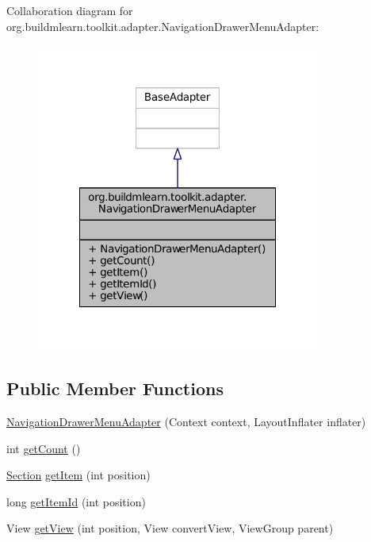 Collaboration diagram for org.\-buildmlearn.\-toolkit.\-adapter.\-Navigation\-Drawer\-Menu\-Adapter\-:
\nopagebreak
\begin{figure}[H]
\begin{center}
\leavevmode
\includegraphics[width=264pt]{d2/d59/classorg_1_1buildmlearn_1_1toolkit_1_1adapter_1_1NavigationDrawerMenuAdapter__coll__graph}
\end{center}
\end{figure}
\subsection*{Public Member Functions}
\begin{DoxyCompactItemize}
\item 
\hyperlink{classorg_1_1buildmlearn_1_1toolkit_1_1adapter_1_1NavigationDrawerMenuAdapter_a148e19ae5430bf4ca719570d18d7aba8}{Navigation\-Drawer\-Menu\-Adapter} (Context context, Layout\-Inflater inflater)
\item 
int \hyperlink{classorg_1_1buildmlearn_1_1toolkit_1_1adapter_1_1NavigationDrawerMenuAdapter_a05a59638b45d17d3852db05405de25c1}{get\-Count} ()
\item 
\hyperlink{enumorg_1_1buildmlearn_1_1toolkit_1_1model_1_1Section}{Section} \hyperlink{classorg_1_1buildmlearn_1_1toolkit_1_1adapter_1_1NavigationDrawerMenuAdapter_a5a1da2dcdb45463a2e24f39f4dc111b9}{get\-Item} (int position)
\item 
long \hyperlink{classorg_1_1buildmlearn_1_1toolkit_1_1adapter_1_1NavigationDrawerMenuAdapter_af4eeb5996c4511df23d9c08f35d2738a}{get\-Item\-Id} (int position)
\item 
View \hyperlink{classorg_1_1buildmlearn_1_1toolkit_1_1adapter_1_1NavigationDrawerMenuAdapter_afb2f8f5d68ab2fe433550cc122479be4}{get\-View} (int position, View convert\-View, View\-Group parent)
\end{DoxyCompactItemize}


